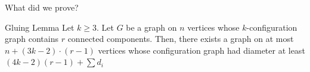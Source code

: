 



%         



\begin{frame}{What did we prove?}
    \begin{lemma}{Gluing Lemma}
        Let \(k \geq 3\). Let \(G\) be a graph on \(n\) vertices whose \(k\)-configuration graph contains \(r\) connected components. Then, there exists a graph on at most \(n+(3k-2)\cdot (r-1)\) vertices whose configuration graph had diameter at least \((4k-2)(r-1)+\sum d_i\)
    \end{lemma}

\end{frame}


